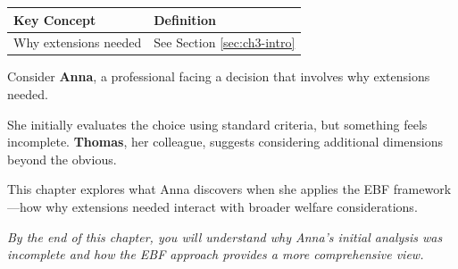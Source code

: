 %
%
%
%
%


\begin{tcolorbox}[
    colback=gray!5!white,
    colframe=gray!75!black,
    title={\textbf{Begriffe in diesem Kapitel}},
    fonttitle=\bfseries
]
\small
\begin{tabular}{@{}ll@{}}
\textbf{Key Concept} & \textbf{Definition} \\
\midrule
Why extensions needed & See Section \ref{sec:ch3-intro} \\
\end{tabular}
\end{tcolorbox}



\begin{tcolorbox}[
    colback=blue!5!white,
    colframe=blue!75!black,
    title={\textbf{Intuition: A Motivating Example}},
    fonttitle=\bfseries
]
Consider \textbf{Anna}, a professional facing a decision that involves why extensions needed.

She initially evaluates the choice using standard criteria, but something feels incomplete.
\textbf{Thomas}, her colleague, suggests considering additional dimensions beyond the obvious.

This chapter explores what Anna discovers when she applies the EBF framework---how
why extensions needed interact with broader welfare considerations.

\medskip
\textit{By the end of this chapter, you will understand why Anna's initial analysis
was incomplete and how the EBF approach provides a more comprehensive view.}
\end{tcolorbox}



